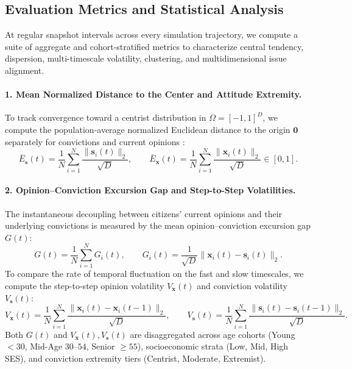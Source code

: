 \documentclass{article}
\begin{document}
\subsection{Evaluation Metrics and Statistical Analysis}
\label{subsec:metrics_analysis}

At regular snapshot intervals across every simulation trajectory, we compute a suite of aggregate and cohort-stratified metrics to characterize central tendency, dispersion, multi-timescale volatility, clustering, and multidimensional issue alignment.

\paragraph{1. Mean Normalized Distance to the Center and Attitude Extremity.}
To track convergence toward a centrist distribution in $\Omega = [-1, 1]^D$, we compute the population-average normalized Euclidean distance to the origin $\mathbf{0}$ separately for convictions and current opinions \citep{howe2017attitude}:
\begin{equation}
    \bar{E}_{\mathbf{s}}(t) = \frac{1}{N}\sum_{i=1}^N \frac{\|\mathbf{s}_i(t)\|_2}{\sqrt{D}}, \qquad
    \bar{E}_{\mathbf{x}}(t) = \frac{1}{N}\sum_{i=1}^N \frac{\|\mathbf{x}_i(t)\|_2}{\sqrt{D}} \in [0, 1].
    \label{eq:mean_distance_to_center}
\end{equation}

\paragraph{2. Opinion--Conviction Excursion Gap and Step-to-Step Volatilities.}
The instantaneous decoupling between citizens' current opinions and their underlying convictions is measured by the mean opinion--conviction excursion gap $G(t)$:
\begin{equation}
    G(t) = \frac{1}{N}\sum_{i=1}^N G_i(t), \qquad G_i(t) = \frac{1}{\sqrt{D}} \|\mathbf{x}_i(t) - \mathbf{s}_i(t)\|_2.
    \label{eq:op_conv_gap}
\end{equation}
To compare the rate of temporal fluctuation on the fast and slow timescales, we compute the step-to-step opinion volatility $V_{\mathbf{x}}(t)$ and conviction volatility $V_{\mathbf{s}}(t)$:
\begin{equation}
    V_{\mathbf{x}}(t) = \frac{1}{N}\sum_{i=1}^N \frac{\|\mathbf{x}_i(t) - \mathbf{x}_i(t-1)\|_2}{\sqrt{D}}, \qquad
    V_{\mathbf{s}}(t) = \frac{1}{N}\sum_{i=1}^N \frac{\|\mathbf{s}_i(t) - \mathbf{s}_i(t-1)\|_2}{\sqrt{D}}.
    \label{eq:step_volatilities}
\end{equation}
Both $G(t)$ and $V_{\mathbf{x}}(t), V_{\mathbf{s}}(t)$ are disaggregated across age cohorts (Young $<30$, Mid-Age $30\text{--}54$, Senior $\ge 55$), socioeconomic strata (Low, Mid, High SES), and conviction extremity tiers (Centrist, Moderate, Extremist).
\end{document}
